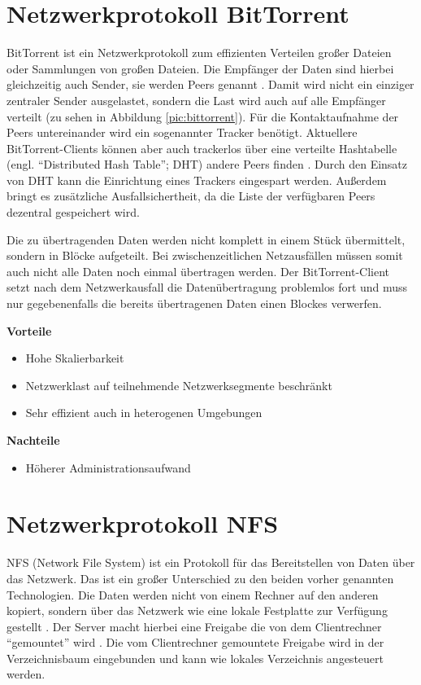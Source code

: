 \section{Netzwerkprotokoll BitTorrent}
BitTorrent ist ein Netzwerkprotokoll zum effizienten Verteilen großer Dateien oder Sammlungen von großen Dateien. Die Empfänger der Daten sind hierbei gleichzeitig auch Sender, sie werden Peers genannt \cite{btspec}. Damit wird nicht ein einziger zentraler Sender ausgelastet, sondern die Last wird auch auf alle Empfänger verteilt (zu sehen in Abbildung \ref{pic:bittorrent}). Für die Kontaktaufnahme der Peers untereinander wird ein sogenannter Tracker benötigt. Aktuellere BitTorrent-Clients können aber auch trackerlos über eine verteilte Hashtabelle (engl. ``Distributed Hash Table''; DHT) andere Peers finden \cite{dhtspec}. Durch den Einsatz von DHT kann die Einrichtung eines Trackers eingespart werden. Außerdem bringt es zusätzliche Ausfallsichertheit, da die Liste der verfügbaren Peers dezentral gespeichert wird. 


Die zu übertragenden Daten werden nicht komplett in einem Stück übermittelt, sondern in Blöcke aufgeteilt. Bei zwischenzeitlichen Netzausfällen müssen somit auch nicht alle Daten noch einmal übertragen werden. Der BitTorrent-Client setzt nach dem Netzwerkausfall die Datenübertragung problemlos fort und muss nur gegebenenfalls die bereits übertragenen Daten einen Blockes verwerfen.

\textbf{Vorteile}
\begin{itemize}
 \item Hohe Skalierbarkeit
 \item Netzwerklast auf teilnehmende Netzwerksegmente beschränkt
 \item Sehr effizient auch in heterogenen Umgebungen
\end{itemize}

\textbf{Nachteile}
\begin{itemize}
  \item Höherer Administrationsaufwand
\end{itemize}

\section{Netzwerkprotokoll NFS}
NFS (Network File System) ist ein Protokoll für das Bereitstellen von Daten über das Netzwerk. Das ist ein großer Unterschied zu den beiden vorher genannten Technologien. Die Daten werden nicht von einem Rechner auf den anderen kopiert, sondern über das Netzwerk wie eine lokale Festplatte zur Verfügung gestellt \cite{nfsspec}. Der Server macht hierbei eine Freigabe die von dem Clientrechner ``gemountet'' wird \cite{nfslinux}. Die vom Clientrechner gemountete Freigabe wird in der Verzeichnisbaum eingebunden und kann wie lokales Verzeichnis angesteuert werden.

